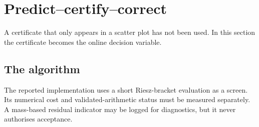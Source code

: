 \documentclass[11pt]{amsart}
\theoremstyle{remark}
\begin{document}
\section{Predict--certify--correct}
\label{sec:pcc}

A certificate that only appears in a scatter plot has not been used.  In this
section the certificate becomes the online decision variable.

\subsection{The algorithm}
\label{ssec:algorithm}

The reported implementation uses a short Riesz-bracket evaluation as
a screen. Its numerical cost and validated-arithmetic status must be
measured separately.  A mass-based residual indicator may be logged for diagnostics, but it
never authorises acceptance.
\end{document}
